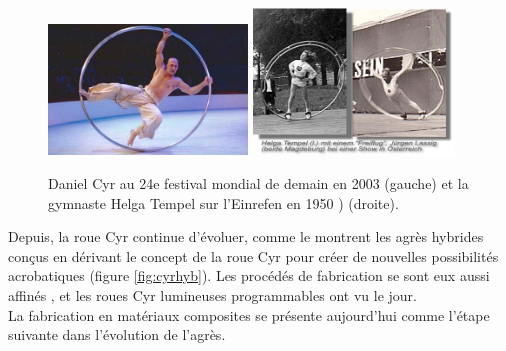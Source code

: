 \begin{figure}[h]
\centering
\includegraphics[width=200]{images_autres/danielcyr2003.jpeg}
\includegraphics[width=200]{images_autres/helga1950.png}
\caption{Daniel Cyr au 24e festival mondial de demain en 2003 \cite{danielcyr} (gauche) et la gymnaste Helga Tempel sur l'Einrefen en 1950 \cite{gymmedia}) (droite).}
\label{fig:cyrhelga}
\end{figure}


Depuis, la roue Cyr continue d'évoluer, comme le montrent les agrès hybrides conçus en dérivant le concept de la roue Cyr pour créer de nouvelles possibilités acrobatiques (figure \ref{fig:cyrhyb}). Les procédés de fabrication se sont eux aussi affinés \cite{corbin}, et les roues Cyr lumineuses programmables ont vu le jour.\\
La fabrication en matériaux composites se présente aujourd'hui comme l'étape suivante dans l'évolution de l'agrès.

